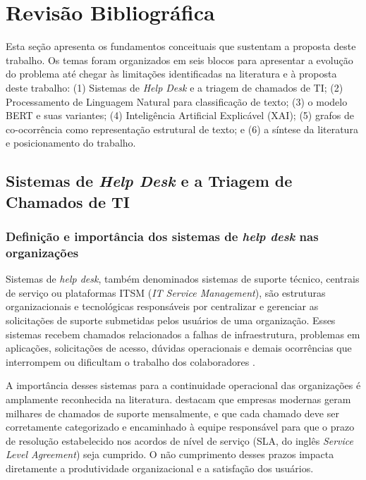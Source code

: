\documentclass[
    12pt,                %
    openright,           %
    oneside,             %
    a4paper,             %
    english,             %
    brazil               %
]{abntex2}
\begin{document}
\chapter{Revisão Bibliográfica}
\label{cap:revisao}

Esta seção apresenta os fundamentos conceituais que sustentam a 
proposta deste trabalho. Os temas foram organizados em seis blocos 
para apresentar a evolução do problema até chegar às limitações 
identificadas na literatura e à proposta deste trabalho: 
(1) Sistemas de \textit{Help Desk} e a triagem de chamados de TI; 
(2) Processamento de Linguagem Natural para classificação de texto; 
(3) o modelo BERT e suas variantes; (4) Inteligência Artificial 
Explicável (XAI); (5) grafos de co-ocorrência como representação 
estrutural de texto; e (6) a síntese da literatura e posicionamento 
do trabalho.

\section{Sistemas de \textit{Help Desk} e a Triagem de Chamados de TI}
\label{sec:helpdesk}

\subsection{Definição e importância dos sistemas de \textit{help desk} nas organizações}
\label{subsec:helpdesk_definicao}

Sistemas de \textit{help desk}, também denominados sistemas de suporte técnico, centrais de serviço ou plataformas ITSM (\textit{IT Service Management}), são estruturas organizacionais e tecnológicas responsáveis por centralizar e gerenciar as solicitações de suporte submetidas pelos usuários de uma organização. Esses sistemas recebem chamados relacionados a falhas de infraestrutura, problemas em aplicações, solicitações de acesso, dúvidas operacionais e demais ocorrências que interrompem ou dificultam o trabalho dos colaboradores \cite{zemp2021}.

A importância desses sistemas para a continuidade operacional das organizações é amplamente reconhecida na literatura.  destacam que empresas modernas geram milhares de chamados de suporte mensalmente, e que cada chamado deve ser corretamente categorizado e encaminhado à equipe responsável para que o prazo de resolução estabelecido nos acordos de nível de serviço (SLA, do inglês \textit{Service Level Agreement}) seja cumprido. O não cumprimento desses prazos impacta diretamente a produtividade organizacional e a satisfação dos usuários.
\end{document}
